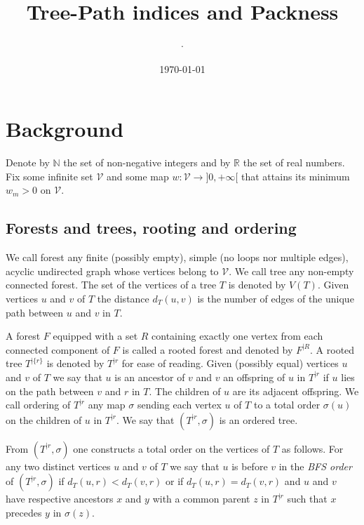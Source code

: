 \documentclass[11 pt]{modarticle}
\title{Tree-Path indices and Packness}
\date{\today}
\author[1]{$\cdot$}
\newcommand{\cN}{\mathbb{N}}
\newcommand{\cR}{\mathbb{R}}
\newcommand{\vset}{\mathcal{V}}
\newcommand{\wmap}{w}
\newcommand{\wmin}{w_m}
\newcommand{\vsetof}[1]{V(#1)}
\newcommand{\distance}[3]{d_{#3}(#1,#2)}
\newcommand{\rtree}[2]{{#1}^{\lvert #2}}
\newcommand{\ortree}[3]{(\rtree{#1}{#2},{#3})}
\begin{document}
\maketitle
\thispagestyle{empty} %

\begin{abstract}
\end{abstract}

\tableofcontents
	
\pagebreak

\section{Background}

Denote by $\cN$ the set of non-negative integers and by $\cR$ the set of real numbers. Fix some infinite set $\vset$ and some map $\wmap : \vset \to ]0,+\infty[$ that attains its minimum $\wmin > 0$ on $\vset$.

\subsection{Forests and trees, rooting and ordering}

We call forest any finite (possibly empty), simple (no loops nor multiple edges), acyclic undirected graph whose vertices belong to $\vset$. We call tree any non-empty connected forest. The set of the vertices of a tree $T$ is denoted by $\vsetof{T}$. Given vertices $u$ and $v$ of $T$ the distance $\distance{u}{v}{T}$ is the number of edges of the unique path between $u$ and $v$ in $T$.

A forest $F$ equipped with a set $R$ containing exactly one vertex from each connected component of $F$ is called a rooted forest and denoted by $\rtree{F}{R}$. %
A rooted tree $\rtree{T}{\{r\}}$ is denoted by $\rtree{T}{r}$ for ease of reading. Given (possibly equal) vertices $u$ and $v$ of $T$ we say that $u$ is an ancestor of $v$ and $v$ an offspring of $u$ in $\rtree{T}{r}$ if $u$ lies on the path between $v$ and $r$ in $T$. The children of $u$ are its adjacent offspring. We call ordering of $\rtree{T}{r}$ any map $\sigma$ sending each vertex $u$ of $T$ to a total order $\sigma(u)$ on the children of $u$ in $\rtree{T}{r}$. We say that $\ortree{T}{r}{\sigma}$ is an ordered tree.

From $\ortree{T}{r}{\sigma}$ one constructs a total order on the vertices of $T$ as follows. For any two distinct vertices $u$ and $v$ of $T$ we say that $u$ is before $v$ in the \textit{BFS order} of $\ortree{T}{r}{\sigma}$ if $\distance{u}{r}{T} < \distance{v}{r}{T}$ or if $\distance{u}{r}{T} = \distance{v}{r}{T}$ and $u$ and $v$ have respective ancestors $x$ and $y$ with a common parent $z$ in $\rtree{T}{r}$ such that $x$ precedes $y$ in $\sigma(z)$. %
\end{document}
